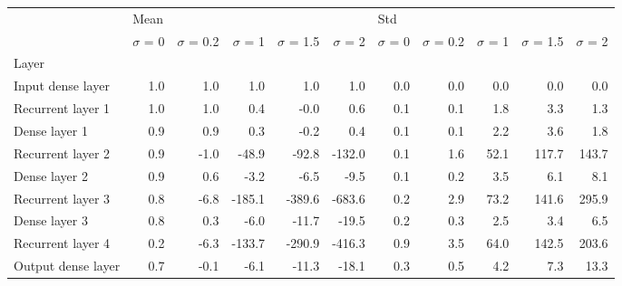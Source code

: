 \begin{tabular}{lrrrrrrrrrr}
\toprule
{} & \multicolumn{5}{l}{Mean} & \multicolumn{5}{l}{Std} \\
{} & $\sigma$  = 0 & $\sigma$  = 0.2 & $\sigma$  = 1 & $\sigma$  = 1.5 & $\sigma$  = 2 & $\sigma$  = 0 & $\sigma$  = 0.2 & $\sigma$  = 1 & $\sigma$  = 1.5 & $\sigma$  = 2 \\
Layer              &               &                 &               &                 &               &               &                 &               &                 &               \\
\midrule
Input dense layer  &           1.0 &             1.0 &           1.0 &             1.0 &           1.0 &           0.0 &             0.0 &           0.0 &             0.0 &           0.0 \\
Recurrent layer 1  &           1.0 &             1.0 &           0.4 &            -0.0 &           0.6 &           0.1 &             0.1 &           1.8 &             3.3 &           1.3 \\
Dense layer 1      &           0.9 &             0.9 &           0.3 &            -0.2 &           0.4 &           0.1 &             0.1 &           2.2 &             3.6 &           1.8 \\
Recurrent layer 2  &           0.9 &            -1.0 &         -48.9 &           -92.8 &        -132.0 &           0.1 &             1.6 &          52.1 &           117.7 &         143.7 \\
Dense layer 2      &           0.9 &             0.6 &          -3.2 &            -6.5 &          -9.5 &           0.1 &             0.2 &           3.5 &             6.1 &           8.1 \\
Recurrent layer 3  &           0.8 &            -6.8 &        -185.1 &          -389.6 &        -683.6 &           0.2 &             2.9 &          73.2 &           141.6 &         295.9 \\
Dense layer 3      &           0.8 &             0.3 &          -6.0 &           -11.7 &         -19.5 &           0.2 &             0.3 &           2.5 &             3.4 &           6.5 \\
Recurrent layer 4  &           0.2 &            -6.3 &        -133.7 &          -290.9 &        -416.3 &           0.9 &             3.5 &          64.0 &           142.5 &         203.6 \\
Output dense layer &           0.7 &            -0.1 &          -6.1 &           -11.3 &         -18.1 &           0.3 &             0.5 &           4.2 &             7.3 &          13.3 \\
\bottomrule
\end{tabular}
